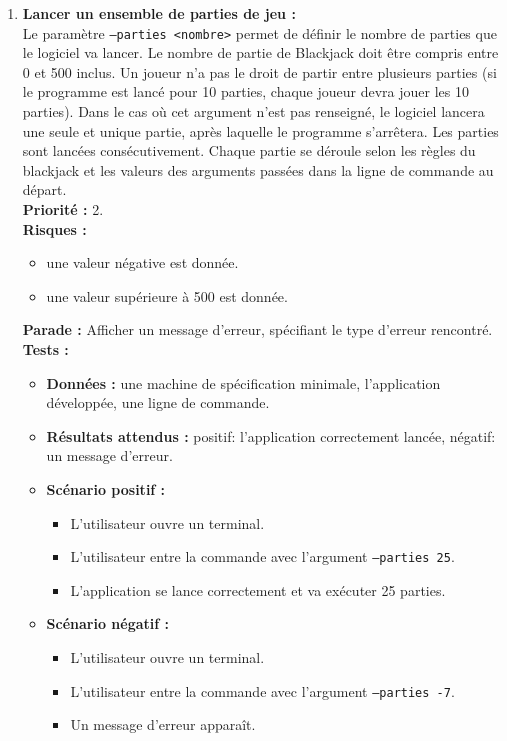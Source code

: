 \documentclass{article}
\newcommand{\code}[1]{\colorbox{light-gray}{\texttt{#1}}}
\begin{document}
\begin{enumerate}
    \item \textbf{Lancer un ensemble de parties de jeu :} \\
    Le paramètre \code{--parties <nombre>} permet de définir le nombre de parties que le logiciel va lancer. Le nombre de partie de Blackjack doit être compris entre 0 et 500 inclus.
    Un joueur n'a pas le droit de partir entre plusieurs parties (si le programme est lancé pour 10 parties, chaque joueur devra jouer les 10 parties). Dans le cas où cet argument n'est pas renseigné, le logiciel lancera une seule et unique partie, après laquelle le programme s'arrêtera. Les parties sont lancées consécutivement. Chaque partie se déroule selon les règles du blackjack et les valeurs des arguments passées dans la ligne de commande au départ. \\
    \textbf{Priorité :} 2. \\
    \textbf{Risques :}
    \begin{itemize}
        \item une valeur négative est donnée.
        \item une valeur supérieure à 500 est donnée.
    \end{itemize}
    \textbf{Parade :} Afficher un message d'erreur, spécifiant le type d'erreur rencontré.\\
    \textbf{Tests :}
    \begin{itemize}
        \item \textbf{Données :} une machine de spécification minimale, l'application développée, une ligne de commande.
        \item \textbf{Résultats attendus :} positif: l'application correctement lancée, négatif: un message d'erreur.
        \item \textbf{Scénario positif :}
        \begin{itemize}
            \item L’utilisateur ouvre un terminal.
            \item L’utilisateur entre la commande avec l'argument \code{--parties 25}.
            \item L'application se lance correctement et va exécuter 25 parties.
        \end{itemize}
        \item \textbf{Scénario négatif :}
        \begin{itemize}
            \item L’utilisateur ouvre un terminal.
            \item L’utilisateur entre la commande avec l'argument \code{--parties -7}.
            \item Un message d'erreur apparaît.
        \end{itemize}
    \end{itemize}
    

\end{enumerate}
\end{document}

